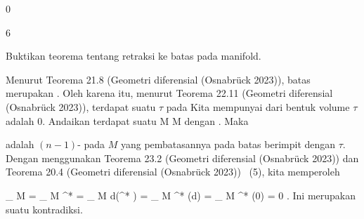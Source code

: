 {0}

{

}
{  }



{6}

{

Buktikan teorema tentang retraksi ke batas pada manifold.

}
{

Menurut
Teorema 21.8 (Geometri diferensial (Osnabrück 2023)),
batas
 merupakan
 {} {.}
Oleh karena itu, menurut
Teorema 22.11 (Geometri diferensial (Osnabrück 2023)),
terdapat suatu
$\tau$ pada
 Kita mempunyai
dari bentuk volume $\tau$ adalah $0$. Andaikan terdapat suatu
\maabbdisp {\varphi} { M } { \partial M
} {}
dengan
. Maka

\mathl{\varphi^* \tau}{} adalah
$(n-1)$-
pada $M$ yang pembatasannya pada batas berimpit dengan $\tau$. Dengan menggunakan
Teorema 23.2 (Geometri diferensial (Osnabrück 2023))
dan
Teorema 20.4 (Geometri diferensial (Osnabrück 2023))  (5),
kita memperoleh

\mavergleichskettealign
{\vergleichskettealign
{
\int_{  \partial M  }  \tau
}
{ =} {
\int_{  \partial  M  }  \varphi^* \tau
}
{ =} {
\int_{   M  }  d(\varphi^* \tau)
}
{ =} {
\int_{   M  }  \varphi^* (d\tau)
}
{ =} {
\int_{   M  }  \varphi^* (0)
}
}
{
\vergleichskettefortsetzungalign
{ =} { 0
}
{ } {}
{ } {}
{ } {}
}
{}{.}
Ini merupakan suatu kontradiksi.

 }
